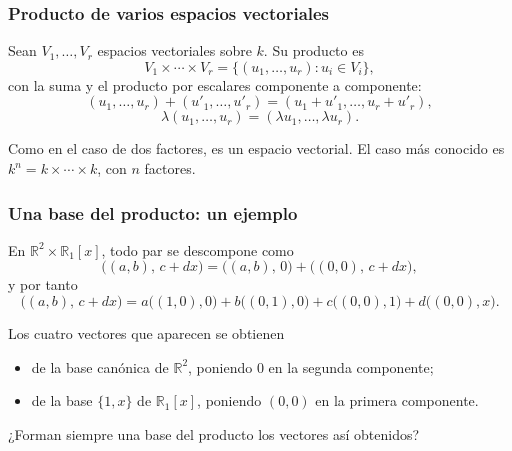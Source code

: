 \begin{frame}
    \frametitle{Producto de varios espacios vectoriales}

    \begin{definition}
        Sean $V_1,\ldots,V_r$ espacios vectoriales sobre $k$.
        Su \alert{producto} es
        \[
            V_1\times\cdots\times V_r
            =
            \{(u_1,\ldots,u_r):u_i\in V_i\},
        \]
        con la suma y el producto por escalares componente a componente:
        \[
            (u_1,\ldots,u_r)+(u'_1,\ldots,u'_r)=(u_1+u'_1,\ldots,u_r+u'_r),
        \]
        \[
            \lambda(u_1,\ldots,u_r)=(\lambda u_1,\ldots,\lambda u_r).
        \]
    \end{definition}

    Como en el caso de dos factores, es un espacio vectorial.
    El caso más conocido es $k^n=k\times\cdots\times k$, con $n$ factores.
\end{frame}


\begin{frame}
    \frametitle{Una base del producto: un ejemplo}

    En $\mathbb{R}^2\times\mathbb{R}_1[x]$, todo par se descompone como
    \[
        \bigl((a,b),\,c+dx\bigr)
        =
        \bigl((a,b),\,0\bigr)+\bigl((0,0),\,c+dx\bigr),
    \]
    y por tanto
    \[
        \bigl((a,b),\,c+dx\bigr)
        =
        a\bigl((1,0),0\bigr)+b\bigl((0,1),0\bigr)
        +c\bigl((0,0),1\bigr)+d\bigl((0,0),x\bigr).
    \]

    \medskip

    Los cuatro vectores que aparecen se obtienen
    \begin{itemize}
        \item de la base canónica de $\mathbb{R}^2$, poniendo $0$
              en la segunda componente;
        \item de la base $\{1,x\}$ de $\mathbb{R}_1[x]$, poniendo $(0,0)$
              en la primera componente.
    \end{itemize}

    \medskip

    \begin{center}
        \alert{¿Forman siempre una base del producto los vectores así obtenidos?}
    \end{center}
\end{frame}


